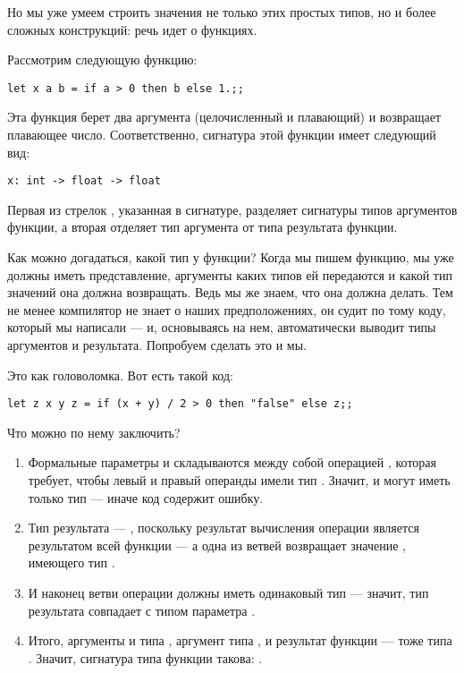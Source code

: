 Но мы уже умеем строить значения не только этих простых типов, но и более 
сложных конструкций: речь идет о функциях.

Рассмотрим следующую функцию:
\begin{verbatim}
let x a b = if a > 0 then b else 1.;;
\end{verbatim}

Эта функция берет два аргумента (целочисленный и плавающий) и возвращает 
плавающее число. Соответственно, сигнатура этой функции имеет следующий вид:
\begin{verbatim}
x: int -> float -> float
\end{verbatim}
Первая из стрелок \s{->}, указанная в сигнатуре, разделяет сигнатуры типов
аргументов функции, а вторая отделяет тип аргумента от типа результата функции.

Как можно догадаться, какой тип у функции?
Когда мы пишем функцию, мы уже должны иметь представление, аргументы каких 
типов ей передаются и какой тип значений она должна возвращать.
Ведь мы же знаем, что она должна делать.
Тем не менее компилятор не знает о наших предположениях, он судит по 
тому коду, который мы написали --- и, основываясь на нем, автоматически
выводит типы аргументов и результата. Попробуем сделать это и мы.

Это как головоломка. Вот есть такой код:
\begin{verbatim}
let z x y z = if (x + y) / 2 > 0 then "false" else z;;
\end{verbatim}
Что можно по нему заключить?
\begin{enumerate}
\item Формальные параметры  и  складываются между собой
операцией \s{+}, которая требует, чтобы левый и правый операнды
имели тип . Значит,  и  могут иметь только тип 
--- иначе код содержит ошибку.
\item Тип результата --- , поскольку результат вычисления 
операции  является результатом всей функции --- а одна из ветвей
возвращает значение , имеющего тип .
\item И наконец ветви операции  должны иметь одинаковый тип ---
значит, тип результата совпадает с типом параметра .
\item Итого, аргументы  и  типа , аргумент  типа
, и результат функции --- тоже типа .
Значит, сигнатура типа функции  такова: 
.
\end{enumerate}

